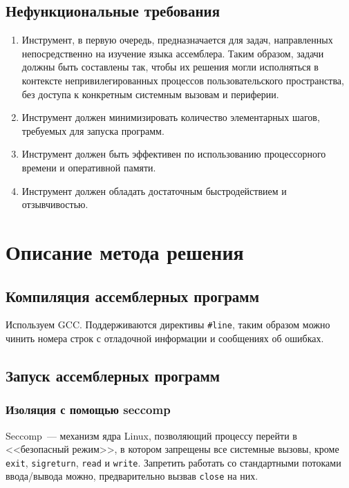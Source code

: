 \documentclass[a4paper,article,14pt]{extarticle}
\begin{document}
\subsection{Нефункциональные требования}

\begin{enumerate}
    \item Инструмент, в первую очередь, предназначается для задач, направленных непосредственно на изучение языка ассемблера. Таким образом, задачи должны быть составлены так, чтобы их решения могли исполняться в контексте непривилегированных процессов пользовательского пространства, без доступа к конкретным системным вызовам и периферии.
    \item Инструмент должен минимизировать количество элементарных шагов, требуемых для запуска программ.
    \item Инструмент должен быть эффективен по использованию процессорного времени и оперативной памяти.
    \item Инструмент должен обладать достаточным быстродействием и отзывчивостью.
\end{enumerate}

\section{Описание метода решения}

\subsection{Компиляция ассемблерных программ}

Используем GCC. Поддерживаются директивы \texttt{\#line}, таким образом можно чинить номера строк с отладочной информации и сообщениях об ошибках.

\subsection{Запуск ассемблерных программ}

\subsubsection{Изоляция с помощью seccomp}

Seccomp~--- механизм ядра Linux, позволяющий процессу перейти в <<безопасный режим>>, в котором запрещены все системные вызовы, кроме \texttt{exit}, \texttt{sigreturn}, \texttt{read} и \texttt{write}. Запретить работать со стандартными потоками ввода/вывода можно, предварительно вызвав \texttt{close} на них.
\end{document}
